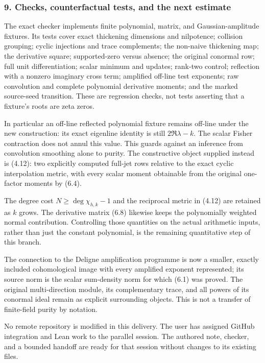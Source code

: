 \subsubsection{9. Checks, counterfactual tests, and the next
estimate}\label{cyclic_sum:checks-counterfactual-tests-and-the-next-estimate}

The exact checker implements finite polynomial, matrix, and
Gaussian-amplitude fixtures. Its tests cover exact thickening dimensions
and nilpotence; collision grouping; cyclic injections and trace
complements; the non-naive thickening map; the derivative square;
supported-zero versus absence; the original conormal row; full unit
differentiation; scalar minimum and updates; rank-two control;
reflection with a nonzero imaginary cross term; amplified off-line test
exponents; raw convolution and complete polynomial derivative moments;
and the marked source-seed transition. These are regression checks, not
tests asserting that a fixture's roots are zeta zeros.

In particular an off-line reflected polynomial fixture remains off-line
under the new construction: its exact eigenline identity is still
\(2\Re\lambda-k\). The scalar Fisher contraction does not annul this
value. This guards against an inference from convolution smoothing alone
to purity. The constructive object supplied instead is (4.12): two
explicitly computed full-jet rows relative to the exact cyclic
interpolation metric, with every scalar moment obtainable from the
original one-factor moments by (6.4).

The degree cost \(N\ge\deg\chi_{h,k}-1\) and the reciprocal metric in
(4.12) are retained as \(k\) grows. The derivative matrix (6.8) likewise
keeps the polynomially weighted normal contribution. Controlling those
quantities on the actual arithmetic inputs, rather than just the
constant polynomial, is the remaining quantitative step of this branch.

The connection to the Deligne amplification programme is now a smaller,
exactly included cohomological image with every amplified exponent
represented; its source norm is the scalar sum-density norm for which
(6.1) was proved. The original multi-direction module, its complementary
trace, and all powers of its conormal ideal remain as explicit
surrounding objects. This is not a transfer of finite-field purity by
notation.

No remote repository is modified in this delivery. The user has assigned
GitHub integration and Lean work to the parallel session. The authored
note, checker, and a bounded handoff are ready for that session without
changes to its existing files.

